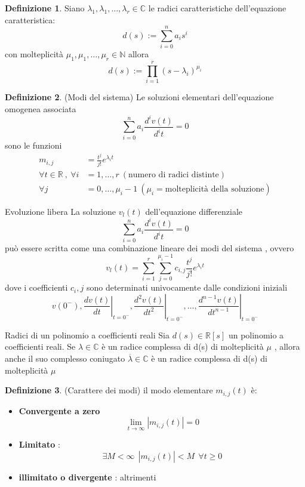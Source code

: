 \documentclass{article}
\theoremstyle{definition}
\newtheorem*{definizione}{Definizione}
\newcommand{\R}{\mathbb{R}}
\newcommand{\la}{\lambda}
\begin{document}
\begin{definizione}
Siano $\la_1,\la_1,\dots,\la_r\in \mathbb{C}$ le radici caratteristiche dell'equazione caratteristica:
	$$d(s):= \sum_{i=0}^{n}a_i s^i$$
	con molteplicità $\mu_1,\mu_1,\dots,\mu_r \in \mathbb{N}$ allora 
$$d(s):=\prod_{i=1}^{r}(s-\la_i)^{\mu_i}$$
\end{definizione}
\begin{definizione}(Modi del sistema)
	Le soluzioni elementari dell'equazione omogenea associata 
		$$\sum_{i=0}^{n}a_i \frac{d^i v(t)}{d^it}=0$$
	sono le funzioni 
	\begin{align*}
m_{i,j}&=\frac{t^j}{j!}e^{\la_i t}\\
\forall t \in \R  \ , \ \forall i&= 1,\dots,r\  (\text{numero di radici distinte}) \\ 
\forall j&=0,\dots,\mu_i-1 \ (\mu_i= \text{molteplicità della soluzione})
\end{align*}	
\end{definizione}
\begin{teo}{Evoluzione libera}{}
	La soluzione $v_l(t)$ dell'equazione differenziale 
		$$\sum_{i=0}^{n}a_i \frac{d^i v(t)}{d^it}=0$$
		può essere scritta come una combinazione lineare dei modi del sistema , ovvero 
		$$v_l(t)=\sum_{i=1}^{r}\sum_{j=0}^{\mu_i-1}c_{i,j}\frac{t^j}{j!}e^{\la_i t}$$
		dove i coefficienti $c_i,j$ sono determinati univocamente dalle condizioni iniziali 
		$$v\left(0^{-}\right),\left.\frac{d v(t)}{d t}\right|_{t=0^{-}},\left.\frac{d^2 v(t)}{d t^2}\right|_{t=0^{-}}, \ldots,\left.\frac{d^{n-1} v(t)}{d t^{n-1}}\right|_{t=0^{-}}
		$$
\end{teo}
\begin{teo}{Radici di un polinomio a coefficienti reali}{}
	Sia $d(s)\in \R[s]$ un polinomio a coefficienti reali. Se $\la \in \mathbb{C}$ è un radice complessa di d(s) di molteplicità $\mu$ , allora anche il suo complesso coniugato $\overline{\la}\in \mathbb{C}$ è un radice complessa di d(s) di molteplicità $\mu$
\end{teo}
\begin{definizione}(Carattere dei modi)
il modo elementare $m_{i,j}(t)$ è: 
\begin{itemize}
	\item \textbf{Convergente a zero} 
	$$\lim_{t \rightarrow \infty} |m_{i,j}(t)|=0$$
	\item  \textbf{Limitato} :
	$$\exists M < \infty \ \  | m_{i,j}(t)|<M \ \ \forall t \geq 0$$
	\item \textbf{illimitato o divergente } : altrimenti  
\end{itemize}
\end{definizione}
\end{document}
